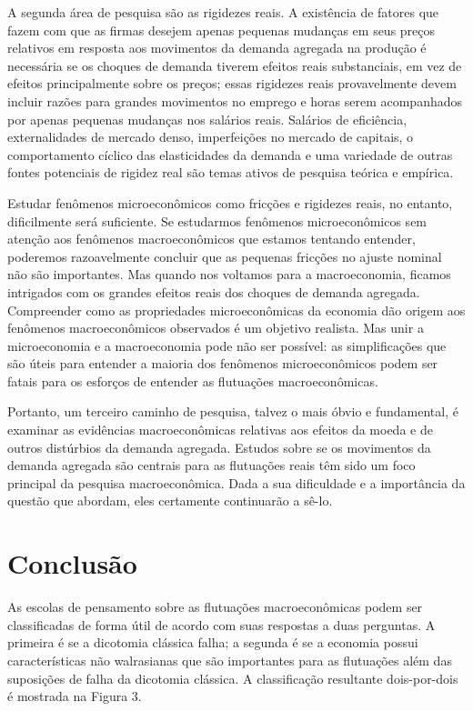 \documentclass[12pt]{article}
\begin{document}
{A segunda área de pesquisa são as rigidezes reais. A existência de fatores que fazem com que as firmas desejem apenas pequenas mudanças em seus preços relativos em resposta aos movimentos da demanda agregada na produção é necessária se os choques de demanda tiverem efeitos reais substanciais, em vez de efeitos principalmente sobre os preços; essas rigidezes reais provavelmente devem incluir razões para grandes movimentos no emprego e horas serem acompanhados por apenas pequenas mudanças nos salários reais. Salários de eficiência, externalidades de mercado denso, imperfeições no mercado de capitais, o comportamento cíclico das elasticidades da demanda e uma variedade de outras fontes potenciais de rigidez real são temas ativos de pesquisa teórica e empírica.

Estudar fenômenos microeconômicos como fricções e rigidezes reais, no entanto, dificilmente será suficiente. Se estudarmos fenômenos microeconômicos sem atenção aos fenômenos macroeconômicos que estamos tentando entender, poderemos razoavelmente concluir que as pequenas fricções no ajuste nominal não são importantes. Mas quando nos voltamos para a macroeconomia, ficamos intrigados com os grandes efeitos reais dos choques de demanda agregada. Compreender como as propriedades microeconômicas da economia dão origem aos fenômenos macroeconômicos observados é um objetivo realista. Mas unir a microeconomia e a macroeconomia pode não ser possível: as simplificações que são úteis para entender a maioria dos fenômenos microeconômicos podem ser fatais para os esforços de entender as flutuações macroeconômicas.

Portanto, um terceiro caminho de pesquisa, talvez o mais óbvio e fundamental, é examinar as evidências macroeconômicas relativas aos efeitos da moeda e de outros distúrbios da demanda agregada. Estudos sobre se os movimentos da demanda agregada são centrais para as flutuações reais têm sido um foco principal da pesquisa macroeconômica. Dada a sua dificuldade e a importância da questão que abordam, eles certamente continuarão a sê-lo.

\section*{Conclusão}

As escolas de pensamento sobre as flutuações macroeconômicas podem ser classificadas de forma útil de acordo com suas respostas a duas perguntas. A primeira é se a dicotomia clássica falha; a segunda é se a economia possui características não walrasianas que são importantes para as flutuações além das suposições de falha da dicotomia clássica. A classificação resultante dois-por-dois é mostrada na Figura 3.

}
\end{document}
